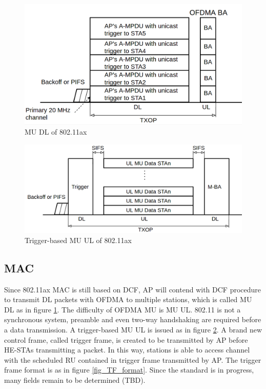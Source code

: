 \begin{figure}[!t]
\includegraphics[scale=0.4]{./figure/fig_MU_DL.png}
\caption{MU DL of 802.11ax}
\label{fig_MU_DL}
\end{figure}


\begin{figure}[!t]
\includegraphics[scale=0.36]{./figure/fig_MU_UL.png}
\caption{Trigger-based MU UL of 802.11ax}
\label{fig_MU_UL}
\end{figure}


\subsection{MAC}
Since 802.11ax MAC is still based on DCF, AP will contend with DCF procedure to transmit DL packets with OFDMA to multiple stations, which is called MU DL as in figure \ref{fig_MU_DL}. 
The difficulty of OFDMA MU is MU UL. 
802.11 is not a synchronous system, preamble and even two-way handshaking are required before a data transmission. 
A trigger-based MU UL is issued as in figure \ref{fig_MU_UL}.
A brand new control frame, called trigger frame, is created to be transmitted by AP before HE-STAs transmitting a packet. 
In this way, stations is able to access channel with the scheduled RU contained in trigger frame transmitted by AP. 
The trigger frame format is as in figure \ref{fig_TF_format}. Since the standard is in progress, many fields remain to be determined (TBD). 

